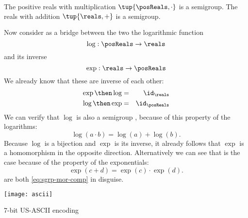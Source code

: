 \begin{example}[Logarithms]
    The positive reals with multiplication  $\tup{\posReals, \cdot}$ is a semigroup.
    The reals with addition $\tup{\reals, +}$ is a semigroup.

    Now consider as a bridge between the two the logarithmic function
    \begin{equation}
        \log :  \posReals \to \reals
    \end{equation}
    and its inverse
    \begin{equation}
        \exp :  \reals \to \posReals
    \end{equation}
    We already know that these are inverse of each other:
    \begin{equation}
    \begin{aligned}
        \exp \then \log &=& \id_{\reals} \\
        \log \then \exp &=& \id_{\posReals}
        \end{aligned}
    \end{equation}
    We can verify that $\log$ is also a semigroup \whomo, because of this property of the logarithms:
    \begin{equation} \label{eq:log-property}
        \log(a \cdot b) = \log(a) + \log(b).
    \end{equation}
    Because $\log$ is a bijection and $\exp$ is its inverse, it already follows that $\exp$ is
    a homomorphism in the opposite direction. Alternatively we can see that is the case because of the property of the exponentials:
    \begin{equation} \label{eq:exp-property}
        \exp(c + d) = \exp(c) \cdot \exp(d).
    \end{equation}
     are both \cref{eq:sgrp-mor-comp} in disguise.
\end{example}



\begin{marginfigure}
\texttt{[image: ascii]}
\caption{7-bit US-ASCII encoding }
\label{fig:ascii}
\end{marginfigure}

